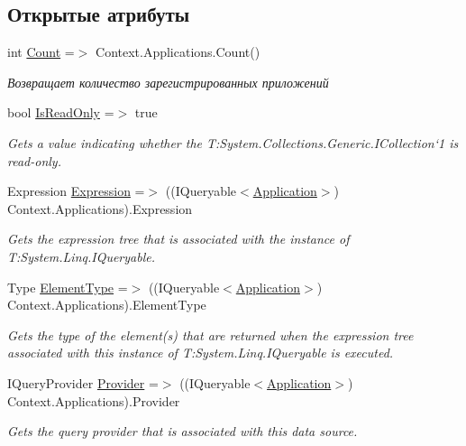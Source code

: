 \subsection*{Открытые атрибуты}
\begin{DoxyCompactItemize}
\item 
int \hyperlink{class_security_1_1_entity_framework_1_1_collections_1_1_application_collection_aa636f6af9d1397c2229f6aede82fd67c}{Count} =$>$ Context.\+Applications.\+Count()
\begin{DoxyCompactList}\small\item\em Возвращает количество зарегистрированных приложений \end{DoxyCompactList}\item 
bool \hyperlink{class_security_1_1_entity_framework_1_1_collections_1_1_application_collection_a55af6df83f3056a9c840fe9add79c9c4}{Is\+Read\+Only} =$>$ true
\begin{DoxyCompactList}\small\item\em Gets a value indicating whether the T\+:\+System.\+Collections.\+Generic.\+I\+Collection`1 is read-\/only. \end{DoxyCompactList}\item 
Expression \hyperlink{class_security_1_1_entity_framework_1_1_collections_1_1_application_collection_a41e255ce668e2507f2ac68ef89ab4a7c}{Expression} =$>$ ((I\+Queryable$<$\hyperlink{class_security_1_1_model_1_1_application}{Application}$>$) Context.\+Applications).Expression
\begin{DoxyCompactList}\small\item\em Gets the expression tree that is associated with the instance of T\+:\+System.\+Linq.\+I\+Queryable. \end{DoxyCompactList}\item 
Type \hyperlink{class_security_1_1_entity_framework_1_1_collections_1_1_application_collection_a6d57d2a528ece38905825146e3aa076e}{Element\+Type} =$>$ ((I\+Queryable$<$\hyperlink{class_security_1_1_model_1_1_application}{Application}$>$) Context.\+Applications).Element\+Type
\begin{DoxyCompactList}\small\item\em Gets the type of the element(s) that are returned when the expression tree associated with this instance of T\+:\+System.\+Linq.\+I\+Queryable is executed. \end{DoxyCompactList}\item 
I\+Query\+Provider \hyperlink{class_security_1_1_entity_framework_1_1_collections_1_1_application_collection_a9f3a6a90748e7eefa51160c5c108825e}{Provider} =$>$ ((I\+Queryable$<$\hyperlink{class_security_1_1_model_1_1_application}{Application}$>$) Context.\+Applications).Provider
\begin{DoxyCompactList}\small\item\em Gets the query provider that is associated with this data source. \end{DoxyCompactList}\end{DoxyCompactItemize}

